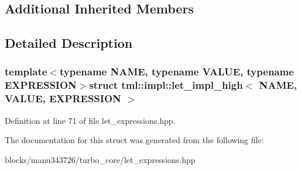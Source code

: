 \subsection*{Additional Inherited Members}


\subsection{Detailed Description}
\subsubsection*{template$<$typename N\+A\+M\+E, typename V\+A\+L\+U\+E, typename E\+X\+P\+R\+E\+S\+S\+I\+O\+N$>$struct tml\+::impl\+::let\+\_\+impl\+\_\+high$<$ N\+A\+M\+E, V\+A\+L\+U\+E, E\+X\+P\+R\+E\+S\+S\+I\+O\+N $>$}



Definition at line 71 of file let\+\_\+expressions.\+hpp.



The documentation for this struct was generated from the following file\+:\begin{DoxyCompactItemize}
\item 
blocks/manu343726/turbo\+\_\+core/let\+\_\+expressions.\+hpp\end{DoxyCompactItemize}

